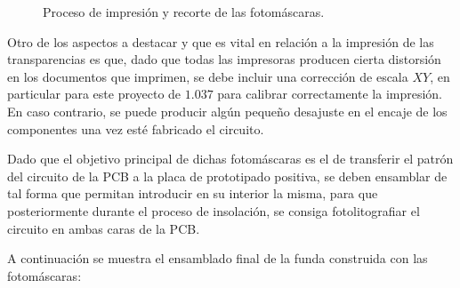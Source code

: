 \begin{enumerate}
    \begin{figure}[H]
    \centering
    \caption{Proceso de impresión y recorte de las fotomáscaras.} 
    \label{fig:Resultado_Recorte}
    \end{figure}
    
    Otro de los aspectos a destacar y que es vital en relación a la impresión de las transparencias es que, dado que todas las impresoras producen cierta distorsión en los documentos que imprimen, se debe incluir una corrección de escala $XY$, en particular para este proyecto de $1.037$ para calibrar correctamente la impresión. En caso contrario, se puede producir algún pequeño desajuste en el encaje de los componentes una vez esté fabricado el circuito.
    
    Dado que el objetivo principal de dichas fotomáscaras es el de transferir el patrón del circuito de la \ac{PCB} a la placa de prototipado positiva, se deben ensamblar de tal forma que permitan introducir en su interior la misma, para que posteriormente durante el proceso de insolación, se consiga fotolitografiar el circuito en ambas caras de la \ac{PCB}.
    
    A continuación se muestra el ensamblado final de la funda construida con las fotomáscaras:
    

\end{enumerate}
